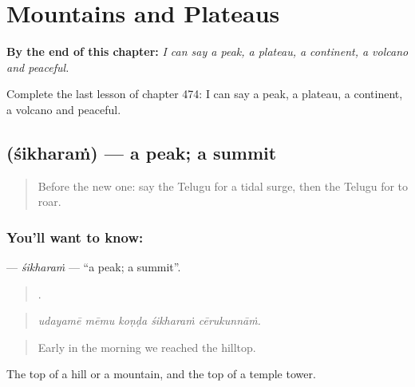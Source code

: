
\chapter{Mountains and Plateaus}
\label{ch:te-mountains-and-plateaus}

\begin{chapteropening}
\textbf{By the end of this chapter:} \emph{I can say a peak, a plateau, a continent, a volcano and peaceful.}

Complete the last lesson of chapter 474: I can say a peak, a plateau, a continent, a volcano and peaceful.
\end{chapteropening}

\section[\texorpdfstring{\te{శిఖరం} (śikharaṁ)}{శిఖరం (śikharaṁ)}]{ (śikharaṁ) — a peak; a summit}

\label{lesson:TE-C474-sikharam}



\begin{quote}
Before the new one: say the Telugu for a tidal surge, then the Telugu for to roar.
\end{quote}

\subsection*{You'll want to know: }
\textbf{} — \emph{śikharaṁ} — \textquotedblleft{}a peak; a summit\textquotedblright{}.

\begin{quote}
    .
\end{quote}

\begin{quote}
\emph{udayamē mēmu koṇḍa śikharaṁ cērukunnāṁ.}
\end{quote}

\begin{quote}
Early in the morning we reached the hilltop.
\end{quote}

The top of a hill or a mountain, and the top of a temple tower.

